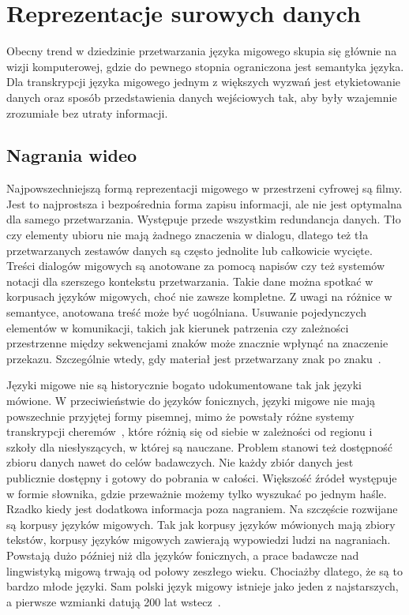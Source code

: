 \section{Reprezentacje surowych danych}
\label{sec:raw-data-representations}

Obecny trend w dziedzinie przetwarzania języka migowego skupia się głównie na wizji komputerowej, gdzie do pewnego stopnia ograniczona jest semantyka języka. Dla transkrypcji języka migowego jednym z większych wyzwań jest etykietowanie danych oraz sposób przedstawienia danych wejściowych tak, aby były wzajemnie zrozumiałe bez utraty informacji.

\subsection{Nagrania wideo}
\label{subsec:video-recordings}

Najpowszechniejszą formą reprezentacji migowego w przestrzeni cyfrowej są filmy. Jest to najprostsza i bezpośrednia forma zapisu informacji, ale nie jest optymalna dla samego przetwarzania. Występuje przede wszystkim redundancja danych. Tło czy elementy ubioru nie mają żadnego znaczenia w dialogu, dlatego też tła przetwarzanych zestawów danych są często jednolite lub całkowicie wycięte. Treści dialogów migowych są anotowane za pomocą napisów czy też systemów notacji dla szerszego kontekstu przetwarzania. Takie dane można spotkać w korpusach języków migowych, choć nie zawsze kompletne. Z uwagi na różnice w semantyce, anotowana treść może być uogólniana. Usuwanie pojedynczych elementów w komunikacji, takich jak kierunek patrzenia czy zależności przestrzenne między sekwencjami znaków może znacznie wpłynąć na znaczenie przekazu. Szczególnie wtedy, gdy materiał jest przetwarzany znak po znaku~\cite{yin2020}.

Języki migowe nie są historycznie bogato udokumentowane tak jak języki mówione. W przeciwieństwie do języków fonicznych, języki migowe nie mają powszechnie przyjętej formy pisemnej, mimo że powstały różne systemy transkrypcji cheremów~\cite{stokoe1966}, które różnią się od siebie w zależności od regionu i szkoły dla niesłyszących, w której są nauczane. Problem stanowi też dostępność zbioru danych nawet do celów badawczych. Nie każdy zbiór danych jest publicznie dostępny i gotowy do pobrania w całości. Większość źródeł występuje w formie słownika, gdzie przeważnie możemy tylko wyszukać po jednym haśle. Rzadko kiedy jest dodatkowa informacja poza nagraniem. Na szczęście rozwijane są korpusy języków migowych. Tak jak korpusy języków mówionych mają zbiory tekstów, korpusy języków migowych zawierają wypowiedzi ludzi na nagraniach. Powstają dużo później niż dla języków fonicznych, a prace badawcze nad lingwistyką migową trwają od połowy zeszłego wieku. Chociażby dlatego, że są to bardzo młode języki. Sam polski język migowy istnieje jako jeden z najstarszych, a pierwsze wzmianki datują 200 lat wstecz~\cite{hollak1879}.

